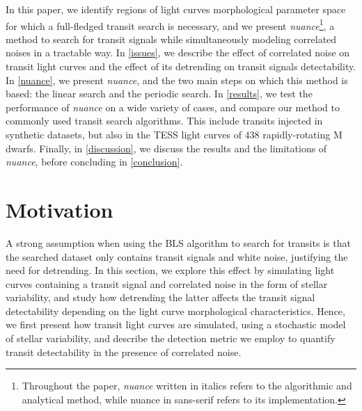 \documentclass[modern]{aastex631}
\newcommand{\nuancemethod}{\textit{nuance}}
\newcommand{\nuance}{\nuancemethod{}}
\newcommand{\nuancecode}{\textsf{nuance}}
\begin{document}
In this paper, we identify regions of light curves morphological parameter space for which a full-fledged transit search is necessary, and we present \nuancemethod{}\footnote{Throughout the paper, \nuancemethod{} written in italics refers to the algorithmic and analytical method, while \nuancecode{} in sans-serif refers to its implementation.}, a method to search for transit signals while simultaneously modeling correlated noises in a tractable way. In \autoref{issues}, we describe the effect of correlated noise on transit light curves and the effect of its detrending on transit signals detectability. In \autoref{nuance}, we present \nuance{}, and the two main steps on which this method is based: the linear search and the periodic search. In \autoref{results}, we test the performance of \nuance{} on a wide variety of cases, and compare our method to commonly used transit search algorithms. This include transits injected in synthetic datasets, but also in the TESS light curves of 438 rapidly-rotating M dwarfs. Finally, in \autoref{discussion}, we discuss the results and the limitations of \nuance{}, before concluding in \autoref{conclusion}.
\newpage
\section{Motivation}\label{issues}
A strong assumption when using the \textsf{BLS} algorithm to search for transits is that the searched dataset only contains transit signals and white noise, justifying the need for detrending. In this section, we explore this effect by simulating light curves containing a transit signal and correlated noise in the form of stellar variability, and study how detrending the latter affects the transit signal detectability depending on the light curve morphological characteristics. Hence, we first present how transit light curves are simulated, using a stochastic model of stellar variability, and describe the detection metric we employ to quantify transit detectability in the presence of correlated noise.
\end{document}
